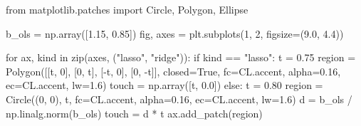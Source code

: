 \documentclass[
  letterpaper,
  10pt,
  twoside,
  openright,
  numbers=noenddot,
  chapterprefix=true]{scrbook}
\newenvironment{Shaded}{}{}
\newcommand{\BuiltInTok}[1]{\textcolor[rgb]{0.84,0.23,0.29}{#1}}
\newcommand{\ControlFlowTok}[1]{\textcolor[rgb]{0.84,0.23,0.29}{#1}}
\newcommand{\DecValTok}[1]{\textcolor[rgb]{0.00,0.36,0.77}{#1}}
\newcommand{\FloatTok}[1]{\textcolor[rgb]{0.00,0.36,0.77}{#1}}
\newcommand{\ImportTok}[1]{\textcolor[rgb]{0.01,0.18,0.38}{#1}}
\newcommand{\KeywordTok}[1]{\textcolor[rgb]{0.84,0.23,0.29}{#1}}
\newcommand{\NormalTok}[1]{\textcolor[rgb]{0.14,0.16,0.18}{#1}}
\newcommand{\OperatorTok}[1]{\textcolor[rgb]{0.14,0.16,0.18}{#1}}
\newcommand{\StringTok}[1]{\textcolor[rgb]{0.01,0.18,0.38}{#1}}
\newcommand{\VariableTok}[1]{\textcolor[rgb]{0.89,0.38,0.04}{#1}}
\begin{document}
\begin{Shaded}
\begin{Highlighting}[]
\ImportTok{from}\NormalTok{ matplotlib.patches }\ImportTok{import}\NormalTok{ Circle, Polygon, Ellipse}

\NormalTok{b\_ols }\OperatorTok{=}\NormalTok{ np.array([}\FloatTok{1.15}\NormalTok{, }\FloatTok{0.85}\NormalTok{])}
\NormalTok{fig, axes }\OperatorTok{=}\NormalTok{ plt.subplots(}\DecValTok{1}\NormalTok{, }\DecValTok{2}\NormalTok{, figsize}\OperatorTok{=}\NormalTok{(}\FloatTok{9.0}\NormalTok{, }\FloatTok{4.4}\NormalTok{))}

\ControlFlowTok{for}\NormalTok{ ax, kind }\KeywordTok{in} \BuiltInTok{zip}\NormalTok{(axes, (}\StringTok{"lasso"}\NormalTok{, }\StringTok{"ridge"}\NormalTok{)):}
    \ControlFlowTok{if}\NormalTok{ kind }\OperatorTok{==} \StringTok{"lasso"}\NormalTok{:}
\NormalTok{        t }\OperatorTok{=} \FloatTok{0.75}
\NormalTok{        region }\OperatorTok{=}\NormalTok{ Polygon([[t, }\DecValTok{0}\NormalTok{], [}\DecValTok{0}\NormalTok{, t], [}\OperatorTok{{-}}\NormalTok{t, }\DecValTok{0}\NormalTok{], [}\DecValTok{0}\NormalTok{, }\OperatorTok{{-}}\NormalTok{t]], closed}\OperatorTok{=}\VariableTok{True}\NormalTok{,}
\NormalTok{                         fc}\OperatorTok{=}\NormalTok{CL.accent, alpha}\OperatorTok{=}\FloatTok{0.16}\NormalTok{, ec}\OperatorTok{=}\NormalTok{CL.accent, lw}\OperatorTok{=}\FloatTok{1.6}\NormalTok{)}
\NormalTok{        touch }\OperatorTok{=}\NormalTok{ np.array([t, }\FloatTok{0.0}\NormalTok{])}
    \ControlFlowTok{else}\NormalTok{:}
\NormalTok{        t }\OperatorTok{=} \FloatTok{0.80}
\NormalTok{        region }\OperatorTok{=}\NormalTok{ Circle((}\DecValTok{0}\NormalTok{, }\DecValTok{0}\NormalTok{), t, fc}\OperatorTok{=}\NormalTok{CL.accent, alpha}\OperatorTok{=}\FloatTok{0.16}\NormalTok{, ec}\OperatorTok{=}\NormalTok{CL.accent, lw}\OperatorTok{=}\FloatTok{1.6}\NormalTok{)}
\NormalTok{        d }\OperatorTok{=}\NormalTok{ b\_ols }\OperatorTok{/}\NormalTok{ np.linalg.norm(b\_ols)}
\NormalTok{        touch }\OperatorTok{=}\NormalTok{ d }\OperatorTok{*}\NormalTok{ t}
\NormalTok{    ax.add\_patch(region)}


\end{Highlighting}
\end{Shaded}
\end{document}
